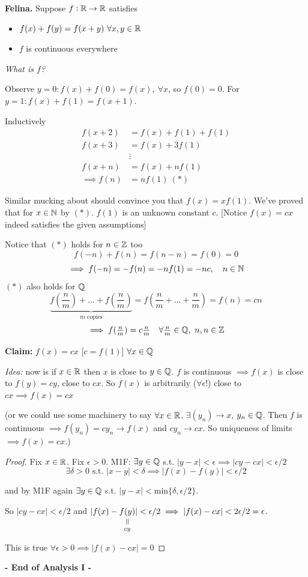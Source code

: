 \documentclass[10pt,twoside]{scrartcl}
\begin{document}
\textbf{Felina.} Suppose $f: \mathbb{R} \to \mathbb{R}$ satisfies
\begin{itemize}
\item $f(x) + f(y) = f(x+y)~\forall x,y\in\mathbb{R}$
\item $f$ is continuous everywhere	
\end{itemize}

\emph{What is $f$?}

Observe $y = 0: f(x) + f(0) = f(x),~\forall x$, so $f(0) = 0$. For $y = 1: f(x) + f(1) = f(x+1)$. 

Inductively 
\begin{align*} f(x+2) &= f(x) + f(1) + f(1) \\
f(x+3) &= f(x) + 3f(1)\\
&\vdots \\ 
 f(x+n) &= f(x) + nf(1)\\
\implies f(n) &= nf(1) ~(*)
\end{align*}

Similar mucking about should convince you that $f(x) = xf(1)$. We've proved that for $x\in\mathbb{N}$ by $(*)$. $f(1)$ is an unknown constant $c$. [Notice $f(x) = cx$ indeed satisfies the given assumptions]

Notice  that $(*)$ holds for $n \in\mathbb{Z}$ too
\[f(-n) + f(n) = f(n-n) = f(0) = 0\]
\[\implies f(-n) = -f(n) = -nf(1) = -nc,\quad n \in\mathbb{N}\]
$(*)$ also holds for $\mathbb{Q}$
\[\textstyle{\underbrace{\textstyle{f(\frac{n}{m}) + \dots + f(\frac{n}{m})}}_{m \text{ copies}} = f(\frac{n}{m} + \dots + \frac{n}{m}) =f(n) = cn}\]
\[\textstyle{\implies f(\frac{n}{m}) = c\frac{n}{m} \quad \forall \frac{n}{m} \in\mathbb{Q},~n,n\in\mathbb{Z}}\]

\textbf{Claim:} $f(x) = cx$ [$c = f(1)$] $\forall x \in\mathbb{Q}$

\emph{Idea:} now is if $x \in\mathbb{R}$ then $x$ is close to $y \in\mathbb{Q}$. $f$ is continuous $\implies f(x)$ is close to $f(y) = cy$, close to $cx$. So $f(x)$ is arbitrarily ($\forall \epsilon!$) close to $cx \implies f(x) = cx$

(or we could use some machinery to say $\forall x \in\mathbb{R}$, $\exists (y_n) \to x$, $y_n \in\mathbb{Q}$. Then $f$ is continuous $\implies f(y_n) = cy_n \to f(x)$ and $cy_n \to cx$. So uniqueness of limits $\implies f(x) = cx$.) 

\begin{proof}
Fix $x \in\mathbb{R}$. Fix $\epsilon >0$. M1F: $\exists y \in\mathbb{Q}$ s.t. $|y-x| < \epsilon \implies |cy - cx| < \epsilon/2$
\[\exists \delta >0\text{ s.t. }|x-y| < \delta \implies |f(x) - f(y)| < \epsilon/2\]

and by M1F again $\exists y\in\mathbb{Q}$ s.t. $|y-x| < \mathrm{min}\{\delta,\epsilon/2\}$. 

So $|cy-cx|< \epsilon/2$ and $|f(x) - \equalto{f(y)}{cy}| < \epsilon/2 \implies |f(x) - cx| < 2\epsilon/2 = \epsilon$. 

This is true $\forall \epsilon >0 \implies |f(x) -cx| = 0$
\end{proof}

\vspace*{20pt}


  \begin{center}  
  \textsf{\textbf{- End of Analysis I -}}	
  \end{center}
  
  
\end{document}
